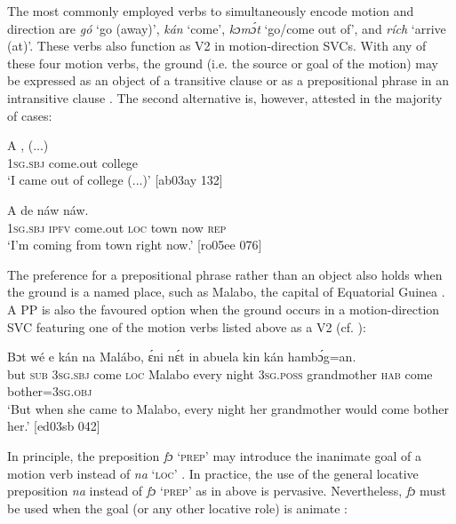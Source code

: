 The most commonly employed verbs to simultaneously encode motion and direction are \textit{gó} ‘go (away)’, \textit{kán} ‘come’, \textit{kɔmɔ́t} ‘go/come out of’, and \textit{rích} ‘arrive (at)’. These verbs also function as V2 in motion-direction SVCs. With any of these four motion verbs, the ground (i.e. the source or goal of the motion) may be expressed as an object of a transitive clause  or as a prepositional phrase in an intransitive clause . The second alternative is, however, attested in the majority of cases:


\ea%
    \label{ex:key:952}
    \gll A        ,  (...)\\
\textsc{1sg.sbj}  come.out  college\\

\glt ‘I came out of college (...)’ [ab03ay 132]
\z


\ea%
    \label{ex:key:953}
    \gll A    de            náw    náw.\\
\textsc{1sg.sbj}  \textsc{ipfv}  come.out  \textsc{loc}  town  now    \textsc{rep}\\

\glt ‘I’m coming from town right now.’  [ro05ee 076]
\z

The preference for a prepositional phrase rather than an object also holds when the ground is a named place, such as Malabo, the capital of Equatorial Guinea . A PP is also the favoured option when the ground occurs in a motion-direction SVC featuring one of the motion verbs listed above as a V2 (cf. ):


\ea%
    \label{ex:key:954}
    \gll Bɔt  wé  e    kán    na  Malábo,  ɛ́ni    nɛ́t
in    abuela    kin  kán    hambɔ́g=an.\\
but  \textsc{sub}  \textsc{3sg.sbj}  come  \textsc{loc}  Malabo  every  night 
\textsc{3sg.poss}  grandmother  \textsc{hab}  come  bother=\textsc{3sg.obj}\\

\glt ‘But when she came to Malabo, every night her grandmother
would come bother her.’ [ed03sb 042]
\z

In principle, the preposition \textit{fɔ} ‘\textsc{prep}’ may introduce the inanimate goal of a motion verb instead of \textit{na} ‘\textsc{loc}’ . In practice, the use of the general locative preposition \textit{na} instead of \textit{fɔ} ‘\textsc{prep’} as in  above is pervasive. Nevertheless, \textit{fɔ} must be used when the goal (or any other locative role) is animate :



